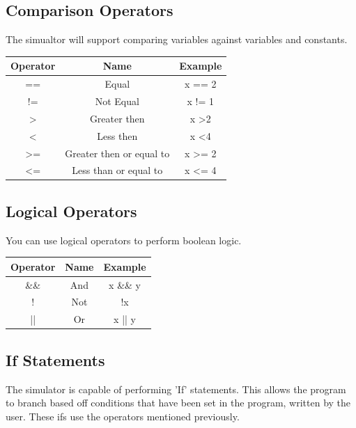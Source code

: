 \documentclass[12pt, a4paper]{report}
\begin{document}
\subsection{Comparison Operators}

The simualtor will support comparing variables against variables and constants.

\begin{center}
\begin{tabular}{ |c|c|c| }
	\hline
	\textbf{Operator} & \textbf{Name} & \textbf{Example} \\
	\hline
	== & Equal & x == 2 \\
	\hline
	!= & Not Equal & x != 1 \\
	\hline
	\textgreater & Greater then & x \textgreater 2 \\
	\hline
	\textless & Less then &  x \textless 4 \\
	\hline
	\textgreater= & Greater then or equal to & x \textgreater= 2 \\
	\hline
	\textless= & Less than or equal to & x \textless= 4 \\
	\hline
\end{tabular}
\end{center}

\subsection{Logical Operators}

You can use logical operators to perform boolean logic.

\begin{center}
\begin{tabular}{ |c|c|c| }
	\hline
	\textbf{Operator} & \textbf{Name} & \textbf{Example} \\
	\hline
	\&\& & And & x \&\& y \\
	\hline
	! & Not & !x \\
	\hline
	|| & Or & x || y \\
	\hline
\end{tabular}
\end{center}

\newpage
\subsection{If Statements}

The simulator is capable of performing 'If' statements. This allows the program to branch based off conditions that have been set in the program, written by the user. These ifs use the operators mentioned previously. 
\end{document}
